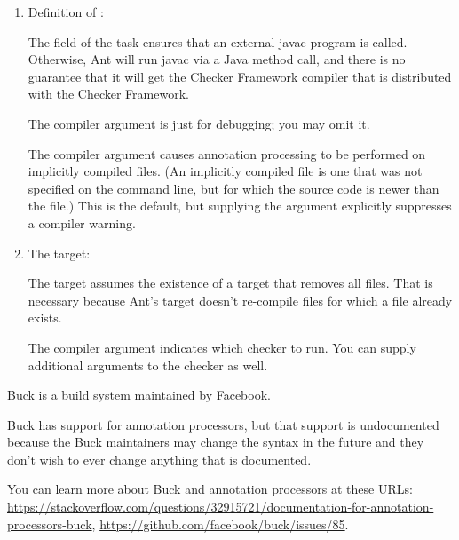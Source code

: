 \begin{enumerate}
\item Definition of :

The  field of the  task
ensures that an external javac program is called.  Otherwise, Ant will run
javac via a Java method call, and there is no guarantee that it will get
the Checker Framework compiler that is distributed with the Checker Framework.

The  compiler argument is just for debugging; you may omit
it.

The  compiler argument causes annotation processing
to be performed on implicitly compiled files.  (An implicitly compiled file
is one that was not specified on the command line, but for which the source
code is newer than the  file.)  This is the default, but
supplying the argument explicitly suppresses a compiler warning.


\item The  target:

The target assumes the existence of a  target that removes all
 files.  That is necessary because Ant's  target
doesn't re-compile  files for which a  file
already exists.

The  compiler argument indicates which checker to
run.  You can supply additional arguments to the checker as well.

\end{enumerate}



Buck is a build system maintained by Facebook.

Buck has support for annotation processors, but that support is
undocumented because the Buck maintainers may change the syntax in the
future and they don't wish to ever change anything that is documented.

You can learn more about Buck and annotation processors at these URLs:
{\codesize\url{https://stackoverflow.com/questions/32915721/documentation-for-annotation-processors-buck}},
{\codesize\url{https://github.com/facebook/buck/issues/85}}.

